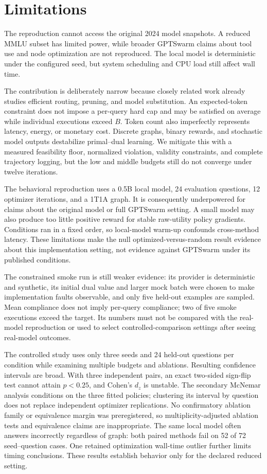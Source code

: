 \section{Limitations}

The reproduction cannot access the original 2024 model snapshots. A reduced MMLU subset has limited power, while broader GPTSwarm claims about tool use and node optimization are not reproduced. The local model is deterministic under the configured seed, but system scheduling and CPU load still affect wall time.

The contribution is deliberately narrow because closely related work already studies efficient routing, pruning, and model substitution. An expected-token constraint does not impose a per-query hard cap and may be satisfied on average while individual executions exceed $B$. Token count also imperfectly represents latency, energy, or monetary cost. Discrete graphs, binary rewards, and stochastic model outputs destabilize primal--dual learning. We mitigate this with a measured feasibility floor, normalized violation, validity constraints, and complete trajectory logging, but the low and middle budgets still do not converge under twelve iterations.

The behavioral reproduction uses a 0.5B local model, 24 evaluation questions, 12 optimizer iterations, and a 1T1A graph. It is consequently underpowered for claims about the original model or full GPTSwarm setting. A small model may also produce too little positive reward for stable raw-utility policy gradients. Conditions ran in a fixed order, so local-model warm-up confounds cross-method latency. These limitations make the null optimized-versus-random result evidence about this implementation setting, not evidence against GPTSwarm under its published conditions.

The constrained smoke run is still weaker evidence: its provider is deterministic and synthetic, its initial dual value and larger mock batch were chosen to make implementation faults observable, and only five held-out examples are sampled. Mean compliance does not imply per-query compliance; two of five smoke executions exceed the target. Its numbers must not be compared with the real-model reproduction or used to select controlled-comparison settings after seeing real-model outcomes.

The controlled study uses only three seeds and 24 held-out questions per condition while examining multiple budgets and ablations. Resulting confidence intervals are broad. With three independent pairs, an exact two-sided sign-flip test cannot attain $p<0.25$, and Cohen's $d_z$ is unstable. The secondary McNemar analysis conditions on the three fitted policies; clustering its interval by question does not replace independent optimizer replications. No confirmatory ablation family or equivalence margin was preregistered, so multiplicity-adjusted ablation tests and equivalence claims are inappropriate. The same local model often answers incorrectly regardless of graph: both paired methods fail on 52 of 72 seed--question cases. One retained optimization wall-time outlier further limits timing conclusions. These results establish behavior only for the declared reduced setting.
